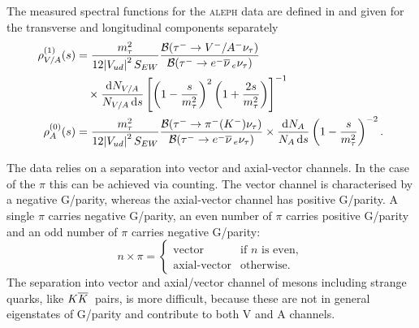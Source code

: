\documentclass[../../index.tex]{subfiles}
\begin{document}
The measured spectral functions for the \textsc{aleph} data are defined in
\cite{Davier2007} and given for the transverse and longitudinal components
separately
\begin{equation}
  \begin{split}
    \rho^{(1)}_{V/A}(s) &= \frac{m_\tau^2}{12 \abs{V_{ud}}^2S_{EW}} \frac{\mathcal{B}(\tau^- \to V^-/A^- \nu_\tau)}{\mathcal{B}(\tau^- \to e^- \anti{\nu}_e \nu_\tau)} \\
    &\quad\times \frac{\dif N_{V/A}}{N_{V/A}\dif s} \left[ \left( 1 - \frac{s}{m_\tau^2} \right)^2 \left( 1 + \frac{2s}{m_\tau^2} \right) \right]^{-1} \\
    \rho^{(0)}_{A}(s) &= \frac{m_\tau^2}{12 \abs{V_{ud}}^2 S_{EW}}
    \frac{\mathcal{B}(\tau^- \to \pi^-(K^-) \nu_\tau)}{\mathcal{B}(\tau^- \to
      e^- \anti{\nu}_e \nu_\tau)} \times \frac{\dif N_A}{N_A \dif s} \left( 1 -
      \frac{s}{m_\tau^2} \right)^{-2}.
  \end{split}
\end{equation}

The data relies on a separation into vector and axial-vector channels. In the
case of the \(\pi\) this can be achieved via counting. The vector channel is
characterised by a negative G\-/parity, whereas the axial-vector channel has
positive G\-/parity. A single \(\pi\) carries negative G\-/parity, an even
number of \(\pi\) carries positive G\-/parity and an odd number of \(\pi\)
carries negative G\-/parity:
\begin{equation}
  n \times \pi = \begin{cases} \mbox{vector} & \mbox{if } n \text{ is even}, \\ \mbox{axial-vector} & \mbox{otherwise.} \end{cases}
\end{equation}
The separation into vector and axial\-/vector channel of mesons including
strange quarks, like \(K\overline{K}\,\) pairs, is more difficult, because these are
not in general eigenstates of G\-/parity and contribute to both \textsc{V} and
\textsc{A} channels.
\end{document}
